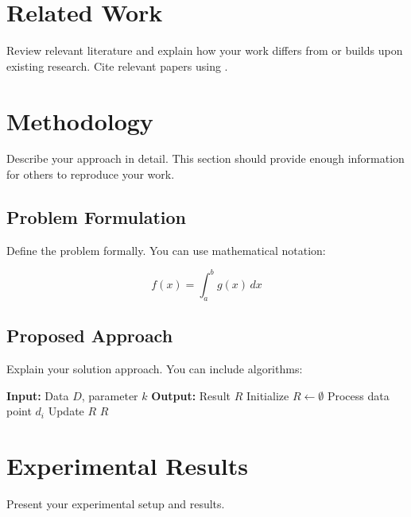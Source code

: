 \documentclass[11pt,a4paper]{article}
\theoremstyle{definition}
\theoremstyle{remark}
\begin{document}
\section{Related Work}
\label{sec:related-work}

Review relevant literature and explain how your work differs from or builds upon existing research. Cite relevant papers using \cite{example-citation}.

\section{Methodology}
\label{sec:methodology}

Describe your approach in detail. This section should provide enough information for others to reproduce your work.

\subsection{Problem Formulation}

Define the problem formally. You can use mathematical notation:

\begin{equation}
    f(x) = \int_{a}^{b} g(x) \, dx
    \label{eq:example}
\end{equation}

\subsection{Proposed Approach}

Explain your solution approach. You can include algorithms:

\begin{algorithm}
\caption{Example Algorithm}
\label{alg:example}
\begin{algorithmic}[1]
\State \textbf{Input:} Data $D$, parameter $k$
\State \textbf{Output:} Result $R$
\State Initialize $R \leftarrow \emptyset$
    \State Process data point $d_i$
    \State Update $R$
\EndFor
\State \Return $R$
\end{algorithmic}
\end{algorithm}

\section{Experimental Results}
\label{sec:results}

Present your experimental setup and results.
\end{document}
